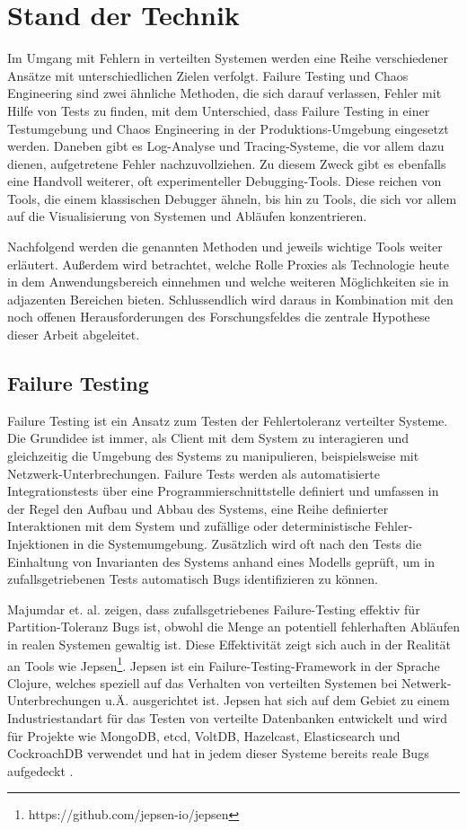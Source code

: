 \documentclass[12pt,a4paper]{report}
\begin{document}
\chapter{Stand der Technik}
Im Umgang mit Fehlern in verteilten Systemen werden eine Reihe verschiedener Ansätze mit unterschiedlichen Zielen verfolgt.
Failure Testing und Chaos Engineering sind zwei ähnliche Methoden, die sich darauf verlassen, Fehler mit Hilfe von Tests zu
finden, mit dem Unterschied, dass Failure Testing in einer Testumgebung und Chaos Engineering in der Produktions-Umgebung
eingesetzt werden. Daneben gibt es Log-Analyse und Tracing-Systeme, die vor allem dazu dienen, aufgetretene Fehler
nachzuvollziehen. Zu diesem Zweck gibt es ebenfalls eine Handvoll weiterer, oft experimenteller Debugging-Tools. Diese reichen von
Tools, die einem klassischen Debugger ähneln, bis hin zu Tools, die sich vor allem auf die Visualisierung von Systemen und Abläufen
konzentrieren. \cite{challenges_and_options}

Nachfolgend werden die genannten Methoden und jeweils wichtige Tools weiter erläutert. Außerdem wird betrachtet, welche Rolle
Proxies als Technologie heute in dem Anwendungsbereich einnehmen und welche weiteren Möglichkeiten sie in adjazenten Bereichen
bieten. Schlussendlich wird daraus in Kombination mit den noch offenen Herausforderungen des Forschungsfeldes die zentrale
Hypothese dieser Arbeit abgeleitet.

\section{Failure Testing}
Failure Testing ist ein Ansatz zum Testen der Fehlertoleranz verteilter Systeme. Die Grundidee ist immer, als Client mit dem
System zu interagieren und gleichzeitig die Umgebung des Systems zu manipulieren, beispielsweise mit Netzwerk-Unterbrechungen.
Failure Tests werden als automatisierte Integrationstests über eine Programmierschnittstelle definiert und umfassen in der Regel den Aufbau
und Abbau des Systems, eine Reihe definierter Interaktionen mit dem System und zufällige oder deterministische Fehler-Injektionen
in die Systemumgebung. Zusätzlich wird oft nach den Tests die Einhaltung von Invarianten des Systems anhand eines Modells geprüft, um
in zufallsgetriebenen Tests automatisch Bugs identifizieren zu können. \cite{failify_masters_thesis}

Majumdar et. al. \cite{why_is_random_testing_effective} zeigen, dass zufallsgetriebenes Failure-Testing effektiv für
Partition-Toleranz Bugs ist, obwohl die Menge an potentiell fehlerhaften Abläufen in realen Systemen gewaltig ist. Diese
Effektivität zeigt sich auch in der Realität an Tools wie Jepsen\footnote{https://github.com/jepsen-io/jepsen}. Jepsen ist ein
Failure-Testing-Framework in der Sprache Clojure, welches speziell auf das Verhalten von verteilten Systemen bei
Netwerk-Unterbrechungen u.Ä. ausgerichtet ist. Jepsen hat sich auf dem Gebiet zu einem Industriestandart für das Testen von
verteilte Datenbanken entwickelt \cite{abstracting_the_geniuses} und wird für Projekte wie MongoDB, etcd, VoltDB, Hazelcast,
Elasticsearch und CockroachDB verwendet und hat in jedem dieser Systeme bereits reale Bugs aufgedeckt \cite{jepsen_analyses}.
\end{document}
